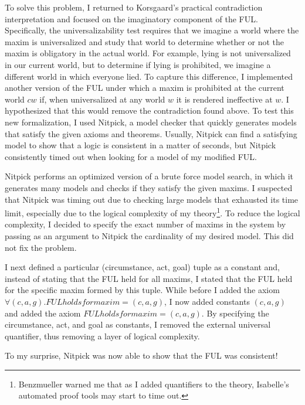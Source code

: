 \begin{isabellebody}
\begin{isamarkuptext}
To solve this problem, I returned to Korsgaard's practical contradiction interpretation and focused 
on the imaginatory component of the FUL. Specifically, the universalizability test requires that we imagine 
a world where the maxim is universalized and study that world to determine whether or not the maxim 
is obligatory in the actual world. For example, lying is not universalized in our current world, but to 
determine if lying is prohibited, we imagine a different world in which everyone lied. To capture this difference,
I implemented another version of the FUL under which  a maxim is prohibited at the current world $cw$ if, 
when universalized at any world $w$ it is rendered ineffective at $w$. I hypothesized that this would remove 
the contradiction found above. To test this new formalization, I used Nitpick, a model checker that 
quickly generates models that satisfy the given axioms and theorems. Usually, Nitpick can find a satisfying 
model to show that a logic is consistent in a matter of seconds, but Nitpick consistently timed out 
when looking for a model of my modified FUL. 

Nitpick performs an optimized version of a brute force model search, in which it generates many models 
and checks if they satisfy the given maxims. I suspected that Nitpick 
was  timing out due to checking large models that exhausted its 
time limit, especially due to the logical complexity of my theory\footnote{Benzmueller warned me that as 
I added quantifiers to the theory, Isabelle's automated proof tools may start to time out.}. 
To reduce the logical complexity, I decided to specify the exact number of maxims 
in the system by passing as an argument to Nitpick the cardinality of my desired model. This did not 
fix the problem. 

I next defined a particular (circumstance, act, goal) tuple as a constant and, instead of
stating that the FUL held for all maxims, I stated that the FUL held for the specific maxim formed by this tuple.
While before I added the axiom $\forall (c, a, g). FUL holds for maxim = (c, a, g)$, I now added constants $(c, a, g)$ 
and added the axiom $FUL holds for maxim = (c, a, g)$. By specifying the circumstance, act, and goal 
as constants, I removed the external universal quantifier, thus removing a layer of logical complexity.

To my surprise, Nitpick was now able to show that the FUL was consistent!


\end{isamarkuptext}
\end{isabellebody}

